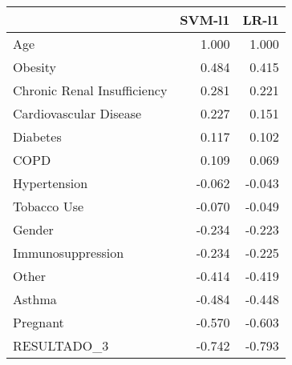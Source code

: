 \begin{tabular}{lrr}
\toprule
{} &  SVM-l1 &  LR-l1 \\
\midrule
Age                         &   1.000 &  1.000 \\
Obesity                     &   0.484 &  0.415 \\
Chronic Renal Insufficiency &   0.281 &  0.221 \\
Cardiovascular Disease      &   0.227 &  0.151 \\
Diabetes                    &   0.117 &  0.102 \\
COPD                        &   0.109 &  0.069 \\
Hypertension                &  -0.062 & -0.043 \\
Tobacco Use                 &  -0.070 & -0.049 \\
Gender                      &  -0.234 & -0.223 \\
Immunosuppression           &  -0.234 & -0.225 \\
Other                       &  -0.414 & -0.419 \\
Asthma                      &  -0.484 & -0.448 \\
Pregnant                    &  -0.570 & -0.603 \\
RESULTADO\_3                 &  -0.742 & -0.793 \\
\bottomrule
\end{tabular}
